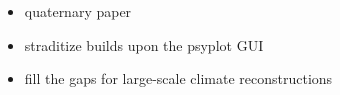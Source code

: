 

\label{chp:straditize}



\begin{itemize}
	\item quaternary paper
	\item straditize builds upon the psyplot GUI
    \item fill the gaps for large-scale climate reconstructions
\end{itemize}
